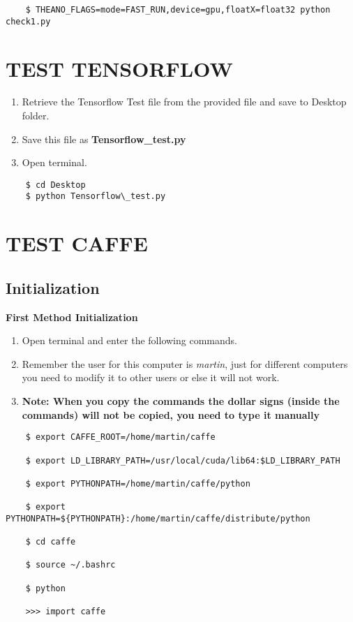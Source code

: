 \documentclass[12pt]{article}
\begin{document}
\begin{lstlisting}
    $ THEANO_FLAGS=mode=FAST_RUN,device=gpu,floatX=float32 python check1.py
\end{lstlisting}

\newpage
\section{TEST TENSORFLOW}\label{TEST TENSORFLOW}

\begin{enumerate}
  \item Retrieve the Tensorflow Test file from the provided file and save to Desktop folder.
  \item Save this file as \textbf{Tensorflow\_test.py}


  \item Open terminal.
\end{enumerate}

\begin{lstlisting}
    $ cd Desktop
    $ python Tensorflow\_test.py
\end{lstlisting}

\newpage
\section{TEST CAFFE}\label{TEST CAFFE}

\subsection{Initialization}

\textbf{First Method Initialization}

\begin{enumerate}
     \item Open terminal and enter the following commands.
     \item Remember the user for this computer is \emph{martin}, just for different computers you need to modify it to other users or else it will not work.
     \item \textbf{Note: When you copy the commands the dollar signs (inside the commands) will not be copied, you need to type it manually}
\end{enumerate}

\begin{lstlisting}
    $ export CAFFE_ROOT=/home/martin/caffe

    $ export LD_LIBRARY_PATH=/usr/local/cuda/lib64:$LD_LIBRARY_PATH

    $ export PYTHONPATH=/home/martin/caffe/python

    $ export PYTHONPATH=${PYTHONPATH}:/home/martin/caffe/distribute/python

    $ cd caffe

    $ source ~/.bashrc

    $ python

    >>> import caffe
\end{lstlisting}
\end{document}
